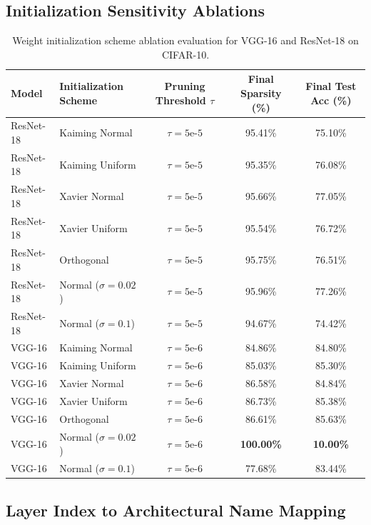 \subsection{Initialization Sensitivity Ablations}

\begin{table}[H]
\caption{Weight initialization scheme ablation evaluation for VGG-16 and ResNet-18 on CIFAR-10.}
\label{tab:app_init_ablation}
\centering
\small
\begin{tabular}{llccc}
\toprule
\textbf{Model} & \textbf{Initialization Scheme} & \textbf{Pruning Threshold $\tau$} & \textbf{Final Sparsity (\%)} & \textbf{Final Test Acc (\%)} \\
\midrule
ResNet-18 & Kaiming Normal & $\tau = 5\text{e-}5$ & 95.41\% & 75.10\% \\
ResNet-18 & Kaiming Uniform & $\tau = 5\text{e-}5$ & 95.35\% & 76.08\% \\
ResNet-18 & Xavier Normal & $\tau = 5\text{e-}5$ & 95.66\% & 77.05\% \\
ResNet-18 & Xavier Uniform & $\tau = 5\text{e-}5$ & 95.54\% & 76.72\% \\
ResNet-18 & Orthogonal & $\tau = 5\text{e-}5$ & 95.75\% & 76.51\% \\
ResNet-18 & Normal ($\sigma = 0.02$) & $\tau = 5\text{e-}5$ & 95.96\% & 77.26\% \\
ResNet-18 & Normal ($\sigma = 0.1$) & $\tau = 5\text{e-}5$ & 94.67\% & 74.42\% \\
\midrule
VGG-16 & Kaiming Normal & $\tau = 5\text{e-}6$ & 84.86\% & 84.80\% \\
VGG-16 & Kaiming Uniform & $\tau = 5\text{e-}6$ & 85.03\% & 85.30\% \\
VGG-16 & Xavier Normal & $\tau = 5\text{e-}6$ & 86.58\% & 84.84\% \\
VGG-16 & Xavier Uniform & $\tau = 5\text{e-}6$ & 86.73\% & 85.38\% \\
VGG-16 & Orthogonal & $\tau = 5\text{e-}6$ & 86.61\% & 85.63\% \\
VGG-16 & Normal ($\sigma = 0.02$) & $\tau = 5\text{e-}6$ & \textbf{100.00\%} & \textbf{10.00\%} \\
VGG-16 & Normal ($\sigma = 0.1$) & $\tau = 5\text{e-}6$ & 77.68\% & 83.44\% \\
\bottomrule
\end{tabular}
\end{table}

\subsection{Layer Index to Architectural Name Mapping}
\label{sec:appendix_layer_mapping}

